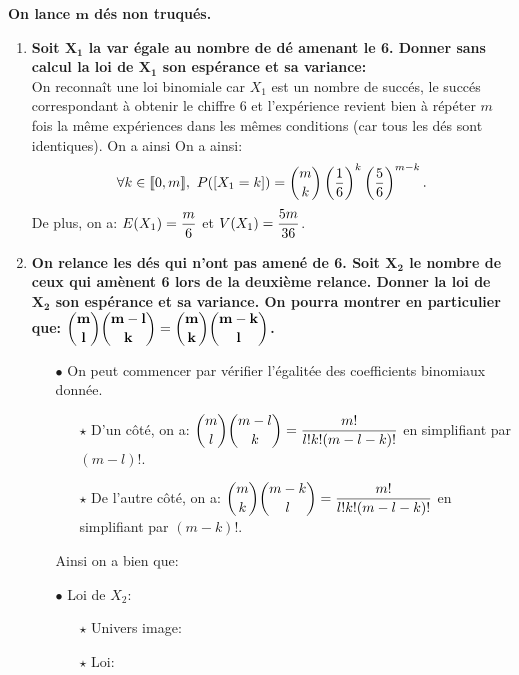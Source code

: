 \documentclass[a4paper, 11pt,reqno]{article}
\begin{document}
\begin{correction}  \;
	\textbf{On lance $\mathbf{m}$ d\'es non truqu\'es.}
	\begin{enumerate}
		\item \textbf{Soit $\mathbf{X_1}$ la var \'egale au nombre de d\'e amenant le 6. Donner sans calcul la loi de $\mathbf{X_1}$ son esp\'erance et sa variance:}\\
		      \noindent On reconna\^{i}t une loi binomiale car $X_1$ est un nombre de succ\'es, le succ\'es correspondant \`{a} obtenir le chiffre 6 et l'exp\'erience revient bien \`{a} r\'ep\'eter $m$ fois la m\^{e}me exp\'eriences dans les m\^{e}mes conditions (car tous les d\'es sont identiques). On a ainsi  On a ainsi:\\
		      $$\forall k\in\llbracket  0,m\rrbracket,\ P(\lbrack X_1=k\rbrack)=\binom{m}{k}\left( \displaystyle\frac{1}{6} \right)^k\left( \displaystyle\frac{5}{6} \right)^{m-k}.$$
		      De plus, on a: $E(X_1)=\displaystyle\frac{m}{6}$ et $V(X_1)=\displaystyle\frac{5m}{36}$.
		\item \textbf{On relance les d\'es qui n'ont pas amen\'e de 6. Soit $\mathbf{X_2}$ le nombre de ceux qui am\`enent 6 lors de la deuxi\`eme relance.
			      Donner la loi de $\mathbf{X_2}$ son esp\'erance et sa variance. On pourra montrer en particulier que: $\mathbf{\displaystyle \binom{m}{l}\displaystyle \binom{m-l}{k}=\displaystyle \binom{m}{k}\displaystyle \binom{m-k}{l}}$.}
		      \begin{itemize}
			      \item[$\bullet$] On peut commencer par v\'erifier l'\'egalit\'ee des coefficients binomiaux donn\'ee.
				      \begin{itemize}
					      \item[$\star$] D'un c\^{o}t\'e, on a: $\displaystyle \binom{m}{l}\displaystyle \binom{m-l}{k}=\displaystyle\frac{m!}{l!k!(m-l-k)!}$ en simplifiant par $(m-l)!$.
					      \item[$\star$] De l'autre c\^{o}t\'e, on a: $\displaystyle \binom{m}{k}\displaystyle \binom{m-k}{l}=\displaystyle\frac{m!}{l!k!(m-l-k)!}$ en simplifiant par $(m-k)!$.
				      \end{itemize}
				      Ainsi on a bien que: 
			      \item[$\bullet$] Loi de $X_2$:
				      \begin{itemize}
					      \item[$\star$] Univers image: 
					      \item[$\star$] Loi:\\

\end{itemize}
\end{itemize}
\end{enumerate}
\end{correction}
\end{document}
